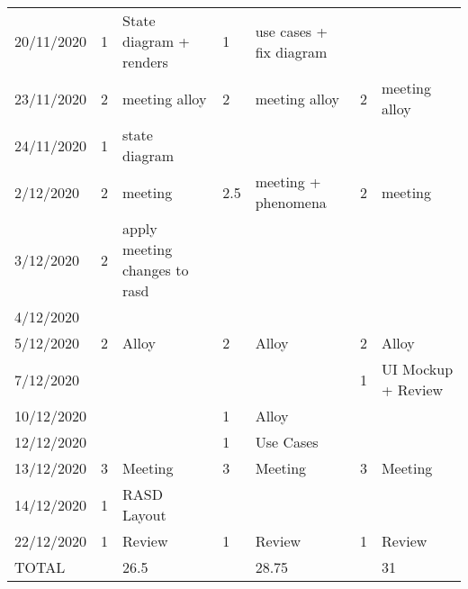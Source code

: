 \begin{table}
\begin{tabular}{|l|l|l|l|l|l|l|}
    20/11/2020    & 1              & State diagram + renders       & 1              & use cases + fix diagram               &                &                                           \\
    23/11/2020    & 2              & meeting alloy                 & 2              & meeting alloy                         & 2              & meeting alloy                             \\
    24/11/2020    & 1              & state diagram                 &                &                                       &                &                                           \\
    2/12/2020     & 2              & meeting                       & 2.5            & meeting + phenomena                   & 2              & meeting                                   \\
    3/12/2020     & 2              & apply meeting changes to rasd &                &                                       &                &                                           \\
    4/12/2020     &                &                               &                &                                       &                &                                           \\
    5/12/2020     & 2              & Alloy                         & 2              & Alloy                                 & 2              & Alloy                                     \\
    7/12/2020     &                &                               &                &                                       & 1              & UI Mockup + Review                        \\
    10/12/2020    &                &                               & 1              & Alloy                                 &                &                                           \\
    12/12/2020    &                &                               & 1              & Use Cases                             &                &                                           \\
    13/12/2020    & 3              & Meeting                       & 3              & Meeting                               & 3              & Meeting                                   \\
    14/12/2020    & 1              & RASD Layout                   &                &                                       &                &                                           \\
    22/12/2020    & 1              & Review                        & 1              & Review                                & 1              & Review                                    \\
    TOTAL         &                & 26.5                          &                & 28.75                                 &                & 31                                       
    \end{tabular}
    \end{table}